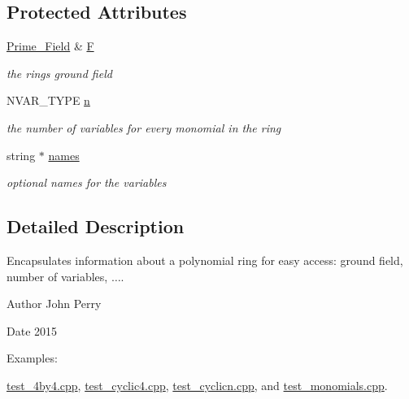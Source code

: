 \subsection*{Protected Attributes}
\begin{DoxyCompactItemize}
\item 
\mbox{\label{class_polynomial___ring_a99cdb13a26bf70032c19fe01a3cea1d8}} 
\hyperlink{class_prime___field}{Prime\+\_\+\+Field} \& \hyperlink{class_polynomial___ring_a99cdb13a26bf70032c19fe01a3cea1d8}{F}
\begin{DoxyCompactList}\small\item\em the ring\textquotesingle{}s ground field \end{DoxyCompactList}\item 
N\+V\+A\+R\+\_\+\+T\+Y\+PE \hyperlink{class_polynomial___ring_abf753b41b3e84bd8e32de314f15f7826}{n}
\begin{DoxyCompactList}\small\item\em the number of variables for every monomial in the ring \end{DoxyCompactList}\item 
\mbox{\label{class_polynomial___ring_ad7634678157b109f713da3a712f2af35}} 
string $\ast$ \hyperlink{class_polynomial___ring_ad7634678157b109f713da3a712f2af35}{names}
\begin{DoxyCompactList}\small\item\em optional names for the variables \end{DoxyCompactList}\end{DoxyCompactItemize}


\subsection{Detailed Description}
Encapsulates information about a polynomial ring for easy access\+: ground field, number of variables, {$\dots$}. 

\begin{DoxyAuthor}{Author}
John Perry 
\end{DoxyAuthor}
\begin{DoxyDate}{Date}
2015 
\end{DoxyDate}
\begin{Desc}
\item[Examples\+: ]\par
\hyperlink{test_4by4_8cpp-example}{test\+\_\+4by4.\+cpp}, \hyperlink{test_cyclic4_8cpp-example}{test\+\_\+cyclic4.\+cpp}, \hyperlink{test_cyclicn_8cpp-example}{test\+\_\+cyclicn.\+cpp}, and \hyperlink{test_monomials_8cpp-example}{test\+\_\+monomials.\+cpp}.\end{Desc}


